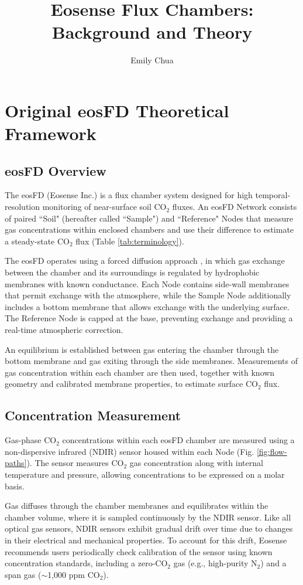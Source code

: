 \documentclass[11pt]{article}
\title{Eosense Flux Chambers: Background and Theory}
\author{Emily Chua}
\begin{document}
\maketitle

\section{Original eosFD Theoretical Framework} \label{sec:orig}
\subsection{eosFD Overview}
The eosFD (Eosense Inc.) is a flux chamber system designed for high temporal-resolution monitoring of near-surface soil CO$_2$ fluxes. An eosFD Network consists of paired ``Soil" (hereafter called ``Sample") and ``Reference" Nodes that measure gas concentrations within enclosed chambers and use their difference to estimate a steady-state CO$_2$ flux (Table \ref{tab:terminology}). 

The eosFD operates using a forced diffusion approach \parencite{risk2011}, in which gas exchange between the chamber and its surroundings is regulated by hydrophobic membranes with known conductance. Each Node contains side-wall membranes that permit exchange with the atmosphere, while the Sample Node additionally includes a bottom membrane that allows exchange with the underlying surface. The Reference Node is capped at the base, preventing exchange and providing a real-time atmospheric correction. 

An equilibrium is established between gas entering the chamber through the bottom membrane and gas exiting through the side membranes. Measurements of gas concentration within each chamber are then used, together with known geometry and calibrated membrane properties, to estimate surface CO$_2$ flux.


\subsection{Concentration Measurement}
Gas-phase CO$_2$ concentrations within each eosFD chamber are measured using a non-dispersive infrared (NDIR) sensor housed within each Node (Fig. \ref{fig:flow-paths}). The sensor measures CO$_2$ gas concentration along with internal temperature and pressure, allowing concentrations to be expressed on a molar basis.

Gas diffuses through the chamber membranes and equilibrates within the chamber volume, where it is sampled continuously by the NDIR sensor. Like all optical gas sensors, NDIR sensors exhibit gradual drift over time due to changes in their electrical and mechanical properties. To account for this drift, Eosense recommends users periodically check calibration of the sensor using known concentration standards, including a zero-CO$_2$ gas (e.g., high-purity N$_2$) and a span gas ($\sim$1,000 ppm CO$_2$). 
\end{document}
